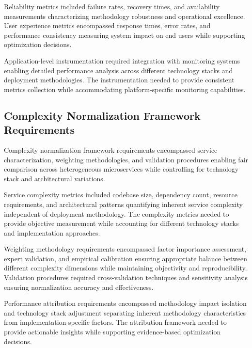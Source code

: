 
Reliability metrics included failure rates, recovery times, and availability measurements characterizing methodology robustness and operational excellence. User experience metrics encompassed response times, error rates, and performance consistency measuring system impact on end users while supporting optimization decisions.

Application-level instrumentation required integration with monitoring systems enabling detailed performance analysis across different technology stacks and deployment methodologies. The instrumentation needed to provide consistent metrics collection while accommodating platform-specific monitoring capabilities.

\subsection{Complexity Normalization Framework Requirements}

Complexity normalization framework requirements encompassed service characterization, weighting methodologies, and validation procedures enabling fair comparison across heterogeneous microservices while controlling for technology stack and architectural variations.

Service complexity metrics included codebase size, dependency count, resource requirements, and architectural patterns quantifying inherent service complexity independent of deployment methodology. The complexity metrics needed to provide objective measurement while accounting for different technology stacks and implementation approaches.


Weighting methodology requirements encompassed factor importance assessment, expert validation, and empirical calibration ensuring appropriate balance between different complexity dimensions while maintaining objectivity and reproducibility. Validation procedures required cross-validation techniques and sensitivity analysis ensuring normalization accuracy and effectiveness.

Performance attribution requirements encompassed methodology impact isolation and technology stack adjustment separating inherent methodology characteristics from implementation-specific factors. The attribution framework needed to provide actionable insights while supporting evidence-based optimization decisions.

